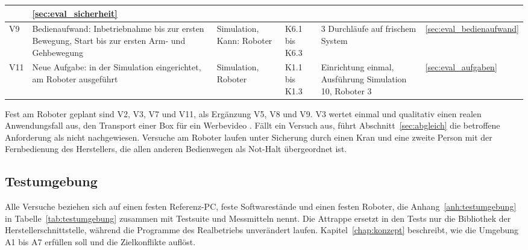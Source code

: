 \begin{table}[!ht]
\begin{tabularx}{\textwidth}{|P{0.7cm}|L|P{1.75cm}|P{1.9cm}|P{2.3cm}|P{1.25cm}|}
        & \ref{sec:eval_sicherheit}\\\hline
        V9 & Bedienaufwand: Inbetriebnahme bis zur ersten Bewegung, Start bis zur ersten Arm- und Gehbewegung & Simulation, Kann: Roboter & K6.1 bis K6.3 & 3 Durchläufe auf frischem System %
        & \ref{sec:eval_bedienaufwand}\\\hline
        V11 & Neue Aufgabe: in der Simulation eingerichtet, am Roboter ausgeführt & Simulation, Roboter & K1.1 bis K1.3 & Einrichtung einmal, Ausführung Simulation 10, Roboter 3 %
        & \ref{sec:eval_aufgaben}\\\hline
    \end{tabularx}
\end{table}

Fest am Roboter geplant sind V2, V3, V7 und V11, als Ergänzung V5, V8 und V9.
V3 wertet einmal und qualitativ einen realen Anwendungsfall aus, den Transport einer Box für ein Werbevideo .
Fällt ein Versuch aus, führt Abschnitt~\ref{sec:abgleich} die betroffene Anforderung als nicht nachgewiesen.
Versuche am Roboter laufen unter Sicherung durch einen Kran und eine zweite Person mit der Fernbedienung des Herstellers, die allen anderen Bedienwegen als Not-Halt übergeordnet ist.

\subsection{Testumgebung}
\label{sec:testumgebung}
Alle Versuche beziehen sich auf einen festen Referenz-PC, feste Softwarestände und einen festen Roboter, die Anhang~\ref{anh:testumgebung} in Tabelle~\ref{tab:testumgebung} zusammen mit Testsuite und Messmitteln nennt.
Die Attrappe ersetzt in den Tests nur die Bibliothek der Herstellerschnittstelle, während die Programme des Realbetriebs unverändert laufen.
Kapitel~\ref{chap:konzept} beschreibt, wie die Umgebung A1 bis A7 erfüllen soll und die Zielkonflikte auflöst.
